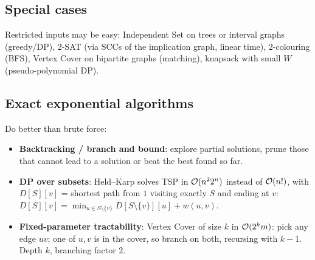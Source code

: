 \subsection{Special cases}
Restricted inputs may be easy: Independent Set on trees or interval graphs (greedy/DP), 2-SAT (via SCCs of the implication graph, linear time),
2-colouring (BFS), Vertex Cover on bipartite graphs (matching), knapsack with small $W$ (pseudo-polynomial DP).

\subsection{Exact exponential algorithms}
Do better than brute force:
\begin{itemize}
  \item \textbf{Backtracking / branch and bound}: explore partial solutions, prune those that cannot lead to a solution or beat the best found so far.
  \item \textbf{DP over subsets}: Held--Karp solves TSP in $\mathcal{O}(n^22^n)$ instead of $\mathcal{O}(n!)$, with $D[S][v]$ = shortest path from $1$ visiting exactly $S$ and ending at $v$:
        $D[S][v]=\min_{u\in S\setminus\{v\}}D[S\setminus\{v\}][u]+w(u,v)$.
  \item \textbf{Fixed-parameter tractability}: Vertex Cover of size $k$ in $\mathcal{O}(2^k m)$: pick any edge $uv$; one of $u,v$ is in the cover, so branch on both, recursing with $k-1$.
        Depth $k$, branching factor 2.
\end{itemize}

